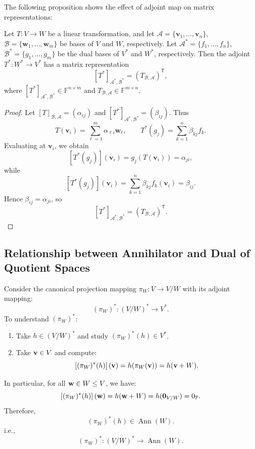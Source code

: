 The following proposition shows the effect of adjoint map on matrix representations:
\begin{proposition}
Let \( T : V \to W \) be a linear transformation, and let \( \mathcal{A} = \{ \mathbf{v}_1, \dots, \mathbf{v}_n \} \), \( \mathcal{B} = \{ \mathbf{w}_1, \dots, \mathbf{w}_m \} \) be bases of \( V \) and \( W \), respectively. Let \( \mathcal{A}^* = \{ f_1, \dots, f_n \} \), \( \mathcal{B}^* = \{ g_1, \dots, g_m \} \) be the dual bases of \( V^* \) and \( W^* \), respectively. Then the adjoint \( T^* : W^* \to V^* \) has a matrix representation
\[
[T^*]_{\mathcal{A}^*, \mathcal{B}^*} = \left(T_{\mathcal{B}, \mathcal{A}}\right)^{\mathsf{T}},
\]
where \([T^*]_{\mathcal{A}^*, \mathcal{B}^*} \in \mathbb{F}^{n \times m}\) and \(T_{\mathcal{B}, \mathcal{A}} \in \mathbb{F}^{m \times n}\).
\end{proposition}

\begin{proof}
Let \([T]_{\mathcal{B},\mathcal{A}}=(\alpha_{ij})\) and \([T^*]_{\mathcal{A}^*,\mathcal{B}^*}=(\beta_{ij})\). Thus
\[
T(\mathbf v_i)=\sum_{\ell=1}^m\alpha_{\ell i}\mathbf w_\ell,
\qquad
T^*(g_j)=\sum_{k=1}^n\beta_{kj}f_k.
\]
Evaluating at \(\mathbf v_i\), we obtain
\[
[T^*(g_j)](\mathbf v_i)
=g_j(T(\mathbf v_i))
=\alpha_{ji},
\]
while
\[
[T^*(g_j)](\mathbf v_i)
=\sum_{k=1}^n\beta_{kj}f_k(\mathbf v_i)
=\beta_{ij}.
\]
Hence \(\beta_{ij}=\alpha_{ji}\), so
\[
[T^*]_{\mathcal{A}^*,\mathcal{B}^*}
=\left(T_{\mathcal{B},\mathcal{A}}\right)^{\mathsf T}.
\]
\end{proof}

\subsection{Relationship between Annihilator and Dual of Quotient Spaces}

\begin{example}
Consider the canonical projection mapping \( \pi_W : V \to V/W \) with its adjoint mapping:
\[
(\pi_W)^* : (V/W)^* \to V^*.
\]
To understand \( (\pi_W)^* \):
\begin{enumerate}
  \item Take \( h \in (V/W)^* \) and study \( (\pi_W)^*(h) \in V^* \).
  \item Take \( {\bf v} \in V \) and compute:
  \[
  \left[(\pi_W)^*(h)\right]({\bf v}) = h(\pi_W({\bf v})) = h({\bf v} + W).
  \]
\end{enumerate}
In particular, for all \( {\bf w} \in W \leq V \), we have:
  \[
  \left[(\pi_W)^*(h)\right]({\bf w}) = h({\bf w} + W) = h({\bf 0}_{V/W}) = 0_{\mathbb{F}}.
  \]
  Therefore, 
  \[
  (\pi_W)^*(h) \in \operatorname{Ann}(W).
  \]
  i.e., 
  \[(\pi_W)^*: (V/W)^* \to \operatorname{Ann}(W).\]
\end{example}

